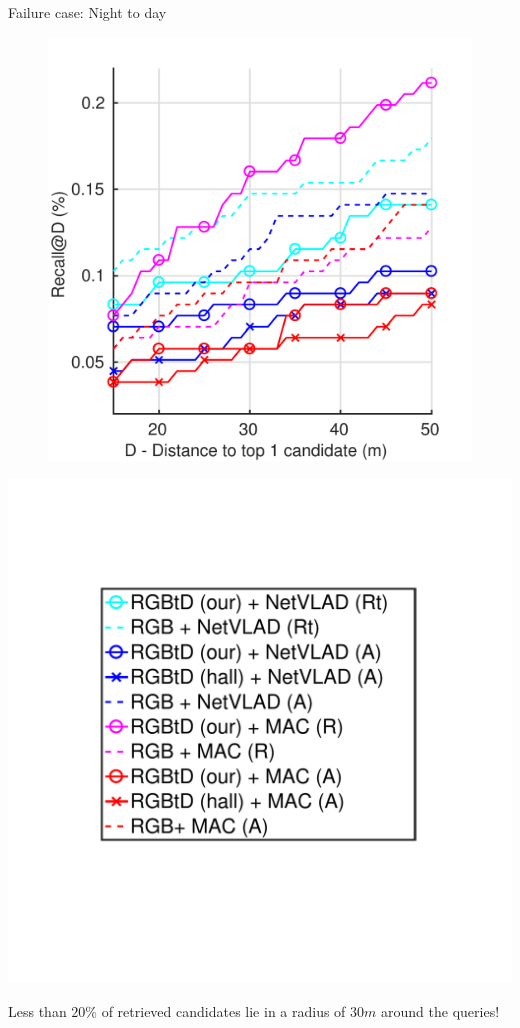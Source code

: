 \begin{frame}{Failure case: Night to day}
	\begin{minipage}{0.49\linewidth}
		\centering
		\begin{figure}
			\includegraphics[width=0.9\linewidth]{vect/res/night}
		\end{figure}
	\end{minipage}\hfill
	\begin{minipage}{0.49\linewidth}
		\includegraphics[trim={90 140 95 100},clip,width=0.5\linewidth]{vect/res/legend}
		\vspace{0.5cm}
		
		Less than $20\%$ of retrieved candidates lie in a radius of $30m$ around the queries!
	\end{minipage}
\end{frame}


